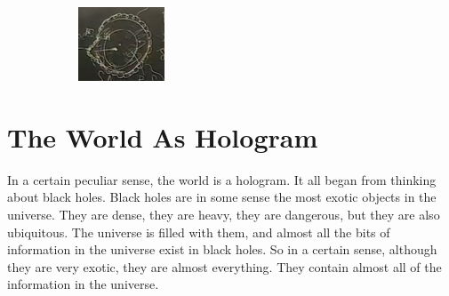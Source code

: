 \documentclass[]{article}
\begin{document}
\begin{figure}[H]
\begin{center}
\begin{subfigure}[t]{0.45\textwidth}
			\includegraphics[width=\textwidth]{ibh-horizon-inside-large}
		\end{subfigure}
	\end{center}
\end{figure}

\section{The World As Hologram}\label{sec:hologram}
In a certain peculiar sense, the world is a hologram.  It all began from thinking about black holes. Black holes are in some sense the most exotic objects in the universe. They are dense, they are heavy, they are dangerous, but they are also ubiquitous. The universe is filled with them, and almost all the bits of information in the universe exist in black holes. So in a certain sense, although they are very exotic, they are almost everything. They contain almost all of the information in the universe.\cite{susskind2011hologram}
\end{document}
